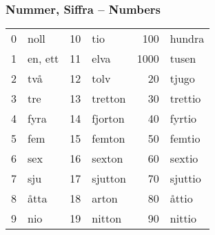 \documentclass[14pt]{refcard} %
\begin{document}
\pagebreak

\subsubsection{Nummer, Siffra -- Numbers}
\vspace{-1ex}
\begin{tabular}{rl rl rl}
0 & noll    &  10 & tio             &  100 & hundra           \\
1 & en, ett &  11 & elva            & 1000 & tusen            \\
2 & två     &  12 & tolv            &   20 & tjugo            \\
3 & tre     &  13 & tretton         &   30 & trettio          \\
4 & fyra    &  14 & fjorton         &   40 & fyrtio           \\
5 & fem     &  15 & femton          &   50 & femtio           \\
6 & sex     &  16 & sexton          &   60 & sextio           \\
7 & sju     &  17 & sjutton         &   70 & sjuttio          \\
8 & åtta    &  18 & arton           &   80 & åttio            \\
9 & nio     &  19 & nitton          &   90 & nittio           \\
\end{tabular}
\end{document}
